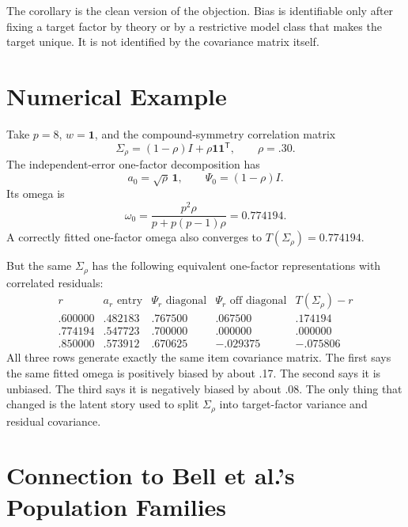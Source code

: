 \documentclass[11pt]{article}
\newcommand{\T}{^{\mathsf T}}
\theoremstyle{plain}
\theoremstyle{remark}
\begin{document}
The corollary is the clean version of the objection. Bias is identifiable only
after fixing a target factor by theory or by a restrictive model class that makes
the target unique. It is not identified by the covariance matrix itself.

\section{Numerical Example}

Take \(p=8\), \(w=\mathbf{1}\), and the compound-symmetry correlation matrix
\[
  \Sigma_\rho=(1-\rho)I+\rho\mathbf{1}\mathbf{1}\T,
  \qquad
  \rho=.30 .
\]
The independent-error one-factor decomposition has
\[
  a_0=\sqrt{\rho}\,\mathbf{1},
  \qquad
  \Psi_0=(1-\rho)I .
\]
Its omega is
\[
  \omega_0
  =
  \frac{p^2\rho}{p+p(p-1)\rho}
  =
  0.774194 .
\]
A correctly fitted one-factor omega also converges to \(T(\Sigma_\rho)=0.774194\).

But the same \(\Sigma_\rho\) has the following equivalent one-factor
representations with correlated residuals:
\[
\begin{array}{c|c|c|c|c}
  r & a_r\text{ entry} & \Psi_r\text{ diagonal} &
  \Psi_r\text{ off diagonal} & T(\Sigma_\rho)-r\\
  \hline
  .600000 & .482183 & .767500 & .067500 & .174194\\
  .774194 & .547723 & .700000 & .000000 & .000000\\
  .850000 & .573912 & .670625 & -.029375 & -.075806
\end{array}
\]
All three rows generate exactly the same item covariance matrix. The first says
the same fitted omega is positively biased by about .17. The second says it is
unbiased. The third says it is negatively biased by about .08. The only thing
that changed is the latent story used to split \(\Sigma_\rho\) into target-factor
variance and residual covariance.

\section{Connection to Bell et al.'s Population Families}
\end{document}

